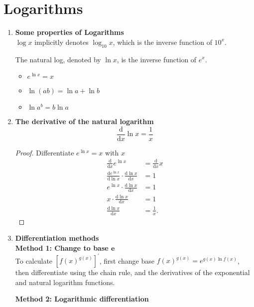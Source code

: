 \section{Logarithms}
\begin{enumerate}
    \item \textbf{Some properties of Logarithms}\\
        \indent\(\log x\) implicitly denotes \(\log_{10}x\), which is the inverse function of \(10^x\).\par
        The natural log, denoted by \(\ln x\), is the inverse function of \(e^x\).
        \begin{itemize}
            \item \(e^{\ln x}=x\)
            \item \(\ln(ab)=\ln a+\ln b\)
            \item \(\ln a^b=b\ln a\)
        \end{itemize}
    \item \textbf{The derivative of the natural logarithm}
        \[
            \frac{\mathrm{d}}{\mathrm{d}x}\ln x=\frac{1}{x}
        \]
        \begin{proof}
            Differentiate \(e^{\ln x}=x\) with \(x\)
            \begin{align*}
                \frac{\mathrm{d}}{\mathrm{d}x}e^{\ln x} & =\frac{\mathrm{d}}{\mathrm{d}x}x\\
                \frac{\mathrm{d}e^{\ln x}}{\mathrm{d}\ln x}\cdot\frac{\mathrm{d}\ln x}{\mathrm{d}x} & =1\\
                e^{\ln x}\cdot\frac{\mathrm{d}\ln x}{\mathrm{d}x} & =1\\
                x\cdot\frac{\mathrm{d}\ln x}{\mathrm{d}x} & =1\\
                \frac{\mathrm{d}\ln x}{\mathrm{d}x} & =\frac{1}{x}.
            \end{align*}
        \end{proof}
    \item \textbf{Differentiation methods}\\
        \indent\textbf{Method 1: Change to base \(\bm{e}\)}\\
        \indent To calculate \(\left[f(x)^{g(x)}\right]^\prime\), first change base \(f(x)^{g(x)}=e^{g(x)\ln f(x)}\), then differentiate using the chain rule, and the derivatives of the exponential and natural logarithm functions.\par
        \textbf{Method 2: Logarithmic differentiation}\\

\end{enumerate}
